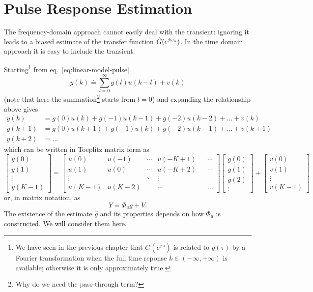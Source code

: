 \chapter{Pulse Response Estimation}
\label{chap:time-domain}


The frequency-domain approach cannot easily deal with the transient: ignoring it leads to a biased estimate of the transfer function $\hat{G}(e^{j\omega_n})$. In the time domain approach it is easy to include the transient.

Starting\footnote{We have seen in the previous chapter that $G(e^{j\omega})$ is related to $g(\tau)$ by a Fourier transformation when the full time reponse $k\in (-\infty,+\infty)$ is available; otherwise it is only approximately true.} from eq.~\eqref{eq:linear-model-pulse}
\begin{equation*}
  y(k) \doteq \sum_{l=0}^\infty g(l)u(k-l) + v(k)
\end{equation*}
(note that here the summation\footnote{Why do we need the pass-through term?} starts from $l=0$) and expanding the relationship above gives
\begin{align*}
  y(k) &= g(0)u(k) + g(-1)u(k-1) + g(-2)u(k-2) + \ldots + v(k) \\
  y(k+1) &= g(0)u(k+1) + g(-1)u(k) + g(-2)u(k-1) + \ldots + v(k+1) \\
  y(k+2) &= \ldots
\end{align*}
which can be written in Toeplitz matrix form as
\begin{equation}
  \label{eq:TD-response-estimation-matrix}
  \begin{bmatrix}
    y(0) \\ y(1) \\ \vdots \\ y(K-1)
  \end{bmatrix} =
  \begin{bmatrix}
    u(0) & u(-1) & \cdots & u(-K+1) && \cdots \\
    u(1) & u(0) & \cdots & u(-K+2) && \cdots \\
    \vdots & & \ddots & \vdots \\
    u(K-1) & u(K-2) & & \cdots & & \hdots
  \end{bmatrix}
  \begin{bmatrix}
    g(0) \\ g(1) \\ g(2) \\ \vdots
  \end{bmatrix} +
  \begin{bmatrix}
    v(0) \\ v(1) \\ \vdots \\ v(K-1)
  \end{bmatrix}
\end{equation}
or, in matrix notation, as
\begin{equation}
  \label{eq:TD-response-estimation}
  Y = \Phi_ug + V.
\end{equation}
The existence of the estimate $\hat{g}$ and its properties depends on how $\Phi_u$ is constructed. We will consider them here.

